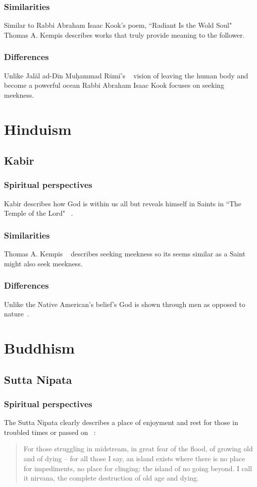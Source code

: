 \documentclass[11pt,a4paper]{scrartcl} %
\begin{document}
     \subsubsection{Similarities}
Similar to Rabbi Abraham Isaac Kook's poem, ``Radiant Is the Wold Soul" ~\citealp[pg. 39]{eknath} Thomas A. Kempis describes works that truly provide meaning to the follower.
     \subsubsection{Differences}
Unlike Jal\={a}l ad-D\={i}n Muḥammad R\={u}m\={i}'s ~\citealp[pg. 246-247]{eknath} vision of leaving the human body and become a powerful ocean Rabbi Abraham Isaac Kook focuses on seeking meekness. 
    \section{Hinduism}
    \subsection{Kabir}
    \subsubsection{Spiritual perspectives}
    Kabir describes how God is within us all but reveals himself in Saints in ``The Temple of the Lord" ~\citealp[pg. 40-41]{eknath}. 
     \subsubsection{Similarities}
    Thomas A. Kempis ~\citealp[pg. 199]{eknath} describes seeking meekness so its seems similar as a Saint might also seek meekness.
     \subsubsection{Differences}
   Unlike the Native American's belief's God is shown through men as opposed to nature~\citealp[pg. 186]{eknath}. 
    \section{Buddhism}
    \subsection{Sutta Nipata}   
\subsubsection{Spiritual perspectives}
 The Sutta Nipata clearly describes a place of enjoyment and rest for those in troubled times or passed on ~\citealp[pg. 200]{eknath}:
\begin{quote}
For those struggling in midstream, in great fear of the flood, of growing old and of dying – for all those I say, an island exists where there is no place for impediments, no place for clinging: the island of no going beyond.
I call it nirvana, the complete destruction of old age and dying.
\end{quote}
\end{document}
